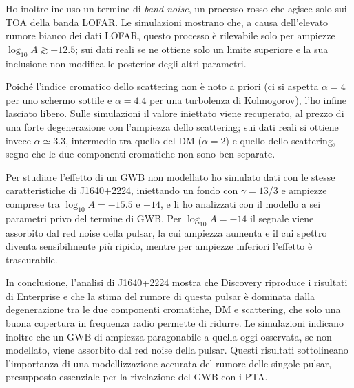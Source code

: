 \documentclass[12pt]{report}
\begin{document}
Ho inoltre incluso un termine di \textit{band noise}, un processo rosso che
agisce solo sui TOA della banda LOFAR. Le simulazioni mostrano che, a causa
dell'elevato rumore bianco dei dati LOFAR, questo processo è rilevabile solo
per ampiezze $\log_{10}A \gtrsim -12.5$; sui dati reali se ne ottiene solo un
limite superiore e la sua inclusione non modifica le posterior degli altri
parametri.\par 

Poiché l'indice cromatico dello scattering non è noto a priori (ci si aspetta
$\alpha = 4$ per uno schermo sottile e $\alpha = 4.4$ per una turbolenza di
Kolmogorov), l'ho infine lasciato libero. Sulle simulazioni il valore iniettato
viene recuperato, al prezzo di una forte degenerazione con l'ampiezza dello
scattering; sui dati reali si ottiene invece $\alpha \simeq 3.3$, intermedio
tra quello del DM ($\alpha = 2$) e quello dello scattering, segno che le due
componenti cromatiche non sono ben separate. \par

Per studiare l'effetto di un GWB non modellato ho simulato dati con le stesse
caratteristiche di J1640+2224, iniettando un fondo con $\gamma = 13/3$ e
ampiezze comprese tra $\log_{10}A = -15.5$ e $-14$, e li ho analizzati con il
modello a sei parametri privo del termine di GWB. Per $\log_{10}A = -14$ il
segnale viene assorbito dal red noise della pulsar, la cui ampiezza aumenta e
il cui spettro diventa sensibilmente più ripido, mentre per ampiezze inferiori
l'effetto è trascurabile. \par

In conclusione, l'analisi di J1640+2224 mostra che Discovery riproduce i
risultati di Enterprise e che la stima del rumore di questa pulsar è dominata
dalla degenerazione tra le due componenti cromatiche, DM e scattering, che solo
una buona copertura in frequenza radio permette di ridurre. Le simulazioni
indicano inoltre che un GWB di ampiezza paragonabile a quella oggi osservata,
se non modellato, viene assorbito dal red noise della pulsar. Questi risultati
sottolineano l'importanza di una modellizzazione accurata del rumore delle
singole pulsar, presupposto essenziale per la rivelazione del GWB con i PTA.
\par



\newpage
\end{document}

